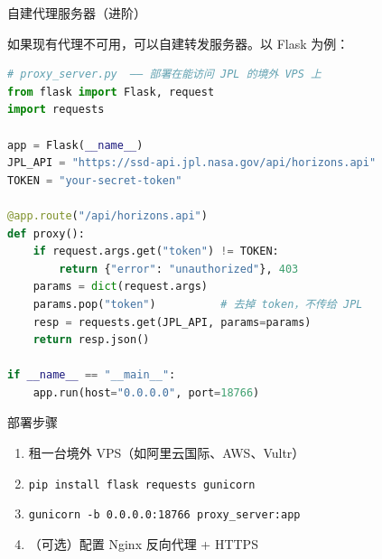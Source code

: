 \documentclass[aspectratio=169]{ctexbeamer}
\begin{document}
\begin{frame}{自建代理服务器（进阶）}
\small

如果现有代理不可用，可以自建转发服务器。以 Flask 为例：

\begin{lstlisting}[language=python]
# proxy_server.py  —— 部署在能访问 JPL 的境外 VPS 上
from flask import Flask, request
import requests

app = Flask(__name__)
JPL_API = "https://ssd-api.jpl.nasa.gov/api/horizons.api"
TOKEN = "your-secret-token"

@app.route("/api/horizons.api")
def proxy():
    if request.args.get("token") != TOKEN:
        return {"error": "unauthorized"}, 403
    params = dict(request.args)
    params.pop("token")          # 去掉 token，不传给 JPL
    resp = requests.get(JPL_API, params=params)
    return resp.json()

if __name__ == "__main__":
    app.run(host="0.0.0.0", port=18766)
\end{lstlisting}

\vspace{0.15cm}

\begin{block}{部署步骤}
  \begin{enumerate}
    \setlength\itemsep{2pt}
    \item 租一台境外 VPS（如阿里云国际、AWS、Vultr）
    \item \texttt{pip install flask requests gunicorn}
    \item \texttt{gunicorn -b 0.0.0.0:18766 proxy\_server:app}
    \item（可选）配置 Nginx 反向代理 + HTTPS
  \end{enumerate}
\end{block}
\end{frame}
\end{document}
